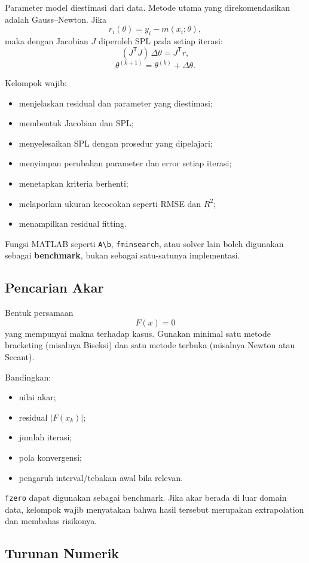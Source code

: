 \documentclass[11pt,a4paper]{article}
\begin{document}
Parameter model diestimasi dari data. Metode utama yang direkomendasikan adalah Gauss--Newton. Jika
\[
r_i(\theta)=y_i-m(x_i;\theta),
\]
maka dengan Jacobian $J$ diperoleh SPL pada setiap iterasi:
\[
(J^{\mathsf T}J)\,\Delta\theta = J^{\mathsf T}r,
\]
\[
\theta^{(k+1)}=\theta^{(k)}+\Delta\theta.
\]

Kelompok wajib:
\begin{itemize}
    \item menjelaskan residual dan parameter yang diestimasi;
    \item membentuk Jacobian dan SPL;
    \item menyelesaikan SPL dengan prosedur yang dipelajari;
    \item menyimpan perubahan parameter dan error setiap iterasi;
    \item menetapkan kriteria berhenti;
    \item melaporkan ukuran kecocokan seperti RMSE dan $R^2$;
    \item menampilkan residual fitting.
\end{itemize}

Fungsi MATLAB seperti \texttt{A\textbackslash b}, \texttt{fminsearch}, atau solver lain boleh digunakan sebagai \textbf{benchmark}, bukan sebagai satu-satunya implementasi.

\subsection{Pencarian Akar}

Bentuk persamaan
\[
F(x)=0
\]
yang mempunyai makna terhadap kasus. Gunakan minimal satu metode bracketing (misalnya Biseksi) dan satu metode terbuka (misalnya Newton atau Secant).

Bandingkan:
\begin{itemize}
    \item nilai akar;
    \item residual $|F(x_k)|$;
    \item jumlah iterasi;
    \item pola konvergensi;
    \item pengaruh interval/tebakan awal bila relevan.
\end{itemize}

\texttt{fzero} dapat digunakan sebagai benchmark. Jika akar berada di luar domain data, kelompok wajib menyatakan bahwa hasil tersebut merupakan extrapolation dan membahas risikonya.

\subsection{Turunan Numerik}
\end{document}
